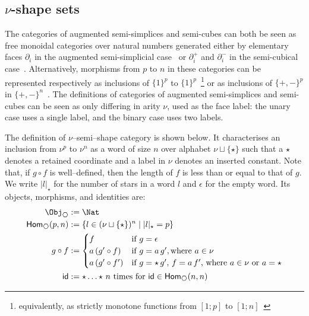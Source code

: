 \documentclass[a4paper,UKenglish,cleveref,autoref]{lipics-v2021}
\newcommand{\kstar}{{\star}}
\begin{document}
\subsection{\texorpdfstring{$\nu$}{nu}-shape sets}

The categories of augmented semi-simplices and semi-cubes can both be seen as free monoidal categories over natural numbers generated either by elementary faces $\partial_i$ in the augmented semi-simplicial case~\cite{grandis01} or $\partial_i^+$ and $\partial_i^-$ in the semi-cubical case~\cite{grandis03,buchholtz17}. Alternatively, morphisms from $p$ to $n$ in these categories can be represented respectively as inclusions of $\{1\}^p$ to $\{1\}^p$~\footnote{equivalently, as strictly monotone functions from $[1;p]$ to $[1;n]$~\cite{maclane1998categories}} or as inclusions of $\{+,-\}^p$ in $\{+,-\}^n$~\cite{Fahrenberg_2024}. The definitions of categories of augmented semi-simplices and semi-cubes can be seen as only differing in arity $\nu$, used as the face label: the unary case uses a single label, and the binary case uses two labels.

\begin{definition}
  The definition of $\nu$--semi--shape category is shown below. It characterises an inclusion from $\nu^p$ to $\nu^n$ as a word of size $n$ over alphabet $\nu \sqcup \{\kstar\}$ such that a $\kstar$ denotes a retained coordinate and a label in $\nu$ denotes an inserted constant.
  Note that, if $g \circ f$ is well--defined, then the length of $f$ is less than or equal to that of $g$. We write $|l|_{\kstar}$ for the number of stars in a word $l$ and $\epsilon$ for the empty word. Its objects, morphisms, and identities are:
  \begin{align*}
    \Obj_{\hexagon}       & := \Nat                                                                       \\
    \Hom_{\hexagon}(p, n) & := \{l \in (\nu \sqcup \{\kstar\})^n \mid |l|_{\kstar} = p\}                  \\
    g \circ f             & :=
    \begin{cases}
      f                & \text{if $g = \epsilon$}                                                   \\
      a\,(g' \circ f)  & \text{if $g = a\,g'$}, \text{where $a \in \nu$}                            \\
      a\,(g' \circ f') & \text{if $g = \kstar\,g'$, $f = a\,f'$, where $a \in \nu$ or $a = \kstar$} \\
    \end{cases}       \\
    \id                   & := \kstar \ldots \kstar \text{ $n$ times for $\id \in \Hom_{\hexagon}(n, n)$}
  \end{align*}
\end{definition}
\end{document}
